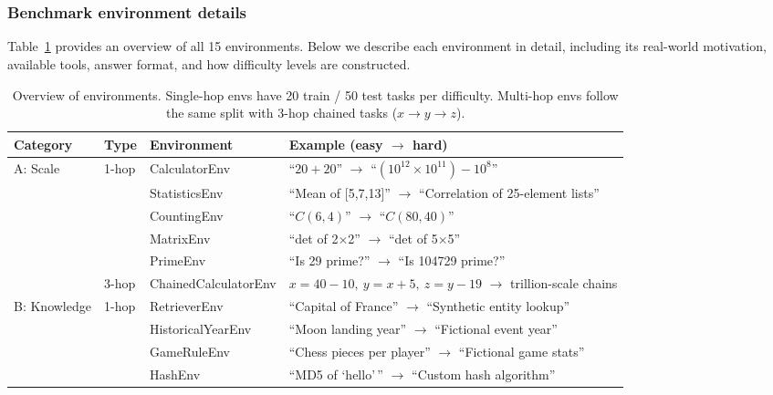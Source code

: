 \appendix

\part{}
\parttoc
\newpage

\section{Benchmark environment details}
\label{app:envs}

Table~\ref{tab:env_details} provides an overview of all 15 environments. Below we describe each environment in detail, including its real-world motivation, available tools, answer format, and how difficulty levels are constructed.

\begin{table}[H]
\caption{Overview of \benchmark{} environments. Single-hop envs have 20 train / 50 test tasks per difficulty. Multi-hop envs follow the same split with 3-hop chained tasks ($x \to y \to z$).}
\label{tab:env_details}
\centering
\small
\begin{tabular}{lllp{6.5cm}}
\toprule
Category & Type & Environment & Example (easy $\to$ hard) \\
\midrule
\multirow{6}{*}{A: Scale}
  & \multirow{5}{*}{1-hop} & CalculatorEnv & ``$20+20$'' $\to$ ``$(10^{12} \times 10^{11}) - 10^8$'' \\
  & & StatisticsEnv & ``Mean of [5,7,13]'' $\to$ ``Correlation of 25-element lists'' \\
  & & CountingEnv & ``$C(6,4)$'' $\to$ ``$C(80,40)$'' \\
  & & MatrixEnv & ``det of 2$\times$2'' $\to$ ``det of 5$\times$5'' \\
  & & PrimeEnv & ``Is 29 prime?'' $\to$ ``Is 104729 prime?'' \\
  \cmidrule(lr){2-4}
  & 3-hop & ChainedCalculatorEnv & $x{=}40{-}10,\ y{=}x{+}5,\ z{=}y{-}19$ $\to$ trillion-scale chains \\
\midrule
\multirow{6}{*}{B: Knowledge}
  & \multirow{5}{*}{1-hop} & RetrieverEnv & ``Capital of France'' $\to$ ``Synthetic entity lookup'' \\
  & & HistoricalYearEnv & ``Moon landing year'' $\to$ ``Fictional event year'' \\
  & & GameRuleEnv & ``Chess pieces per player'' $\to$ ``Fictional game stats'' \\
  & & HashEnv & ``MD5 of `hello'\,'' $\to$ ``Custom hash algorithm'' \\

\end{tabular}
\end{table}

